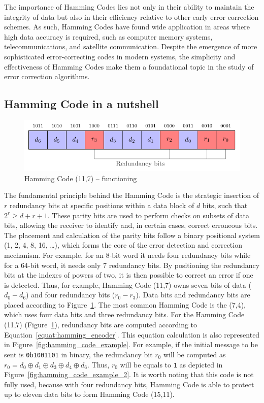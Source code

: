 The importance of Hamming Codes lies not only in their ability to maintain the integrity of data but also in their efficiency relative to other early error correction schemes. As such, Hamming Codes have found wide application in areas where high data accuracy is required, such as computer memory systems, telecommunications, and satellite communication. Despite the emergence of more sophisticated error-correcting codes in modern systems, the simplicity and effectiveness of Hamming Codes make them a foundational topic in the study of error correction algorithms.

\subsection{Hamming Code in a nutshell}

\begin{figure}[ht]
    \centering
    \includegraphics[page=1]{c5_countermeasures_dift/img/hamming_bit.pdf}
    \caption{Hamming Code (11,7) -- functioning}
    \label{fig:hamming_functionning}
\end{figure}

The fundamental principle behind the Hamming Code is the strategic insertion of $r$ redundancy bits at specific positions within a data block of $d$ bits, such that \(2^r \geqslant d + r + 1\).
These parity bits are used to perform checks on subsets of data bits, allowing the receiver to identify and, in certain cases, correct erroneous bits. The placement and calculation of the parity bits follow a binary positional system (1, 2, 4, 8, 16, \ldots), which forms the core of the error detection and correction mechanism. For example, for an 8-bit word it needs four redundancy bits while for a 64-bit word, it needs only 7 redundancy bits. By positioning the redundancy bits at the indexes of powers of two, it is then possible to correct an error if one is detected. Thus, for example, Hamming Code (11,7) owns seven bits of data ($d_{0}-d_{6}$) and four redundancy bits ($r_{0}-r_{3}$). Data bits and redundancy bits are placed according to Figure~\ref{fig:hamming_functionning}. The most common Hamming Code is the (7,4), which uses four data bits and three redundancy bits.
For the Hamming Code (11,7) (Figure~\ref{fig:hamming_functionning}), redundancy bits are computed according to Equation~\ref{equat:hamming_encoder}. This equation calculation is also represented in Figure~\ref{fig:hamming_code_example}. For example, if the initial message to be sent is \texttt{0b1001101} in binary, the redundancy bit $r_0$ will be computed as $r_0 = d_{0} \oplus d_{1} \oplus d_{3} \oplus d_{4} \oplus d_{6}$. Thus, $r_0$ will be equals to \texttt{1} as depicted in Figure~\ref{fig:hamming_code_example_2}. It is worth noting that this code is not fully used, because with four redundancy bits, Hamming Code is able to protect up to eleven data bits to form Hamming Code (15,11).

